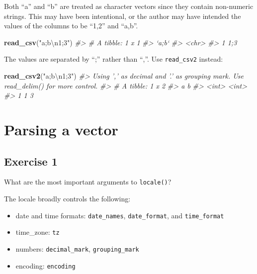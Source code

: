 \documentclass[]{book}
\newenvironment{Shaded}{\begin{snugshade}}{\end{snugshade}}
\newcommand{\CharTok}[1]{\textcolor[rgb]{0.31,0.60,0.02}{#1}}
\newcommand{\CommentTok}[1]{\textcolor[rgb]{0.56,0.35,0.01}{\textit{#1}}}
\newcommand{\KeywordTok}[1]{\textcolor[rgb]{0.13,0.29,0.53}{\textbf{#1}}}
\newcommand{\NormalTok}[1]{#1}
\newcommand{\StringTok}[1]{\textcolor[rgb]{0.31,0.60,0.02}{#1}}
\providecommand{\tightlist}{%
  \setlength{\itemsep}{0pt}\setlength{\parskip}{0pt}}
\theoremstyle{definition}
\theoremstyle{definition}
\theoremstyle{definition}
\theoremstyle{remark}
\begin{document}
Both ``a'' and ``b'' are treated as character vectors since they contain
non-numeric strings. This may have been intentional, or the author may
have intended the values of the columns to be ``1,2'' and ``a,b''.

\begin{Shaded}
\begin{Highlighting}[]
\KeywordTok{read_csv}\NormalTok{(}\StringTok{"a;b}\CharTok{\textbackslash{}n}\StringTok{1;3"}\NormalTok{)}
\CommentTok{#> # A tibble: 1 x 1}
\CommentTok{#>   `a;b`}
\CommentTok{#>   <chr>}
\CommentTok{#> 1 1;3}
\end{Highlighting}
\end{Shaded}

The values are separated by ``;'' rather than ``,''. Use
\texttt{read\_csv2} instead:

\begin{Shaded}
\begin{Highlighting}[]
\KeywordTok{read_csv2}\NormalTok{(}\StringTok{"a;b}\CharTok{\textbackslash{}n}\StringTok{1;3"}\NormalTok{)}
\CommentTok{#> Using ',' as decimal and '.' as grouping mark. Use read_delim() for more control.}
\CommentTok{#> # A tibble: 1 x 2}
\CommentTok{#>       a     b}
\CommentTok{#>   <int> <int>}
\CommentTok{#> 1     1     3}
\end{Highlighting}
\end{Shaded}

\hypertarget{parsing-a-vector}{%
\section{Parsing a vector}\label{parsing-a-vector}}

\hypertarget{exercise-1-15}{%
\subsection{Exercise 1}\label{exercise-1-15}}

What are the most important arguments to \texttt{locale()}?

The locale broadly controls the following:

\begin{itemize}
\tightlist
\item
  date and time formats: \texttt{date\_names}, \texttt{date\_format},
  and \texttt{time\_format}
\item
  time\_zone: \texttt{tz}
\item
  numbers: \texttt{decimal\_mark}, \texttt{grouping\_mark}
\item
  encoding: \texttt{encoding}
\end{itemize}
\end{document}
